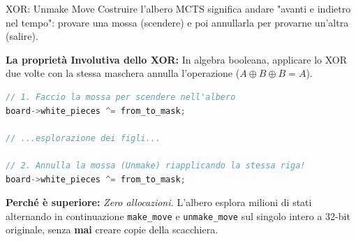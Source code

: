 \documentclass[10pt]{beamer}
\begin{document}
\begin{frame}[fragile]{XOR: Unmake Move}
    Costruire l'albero MCTS significa andare "avanti e indietro nel tempo": provare una mossa (scendere) e poi annullarla per provarne un'altra (salire).
    
    \vspace{0.1cm}
    
    \textbf{La proprietà Involutiva dello XOR:}
    In algebra booleana, applicare lo XOR due volte con la stessa maschera annulla l'operazione ($A \oplus B \oplus B = A$).
    
\begin{lstlisting}[language=C, basicstyle=\ttfamily\footnotesize, keywordstyle=\color{blue}]
// 1. Faccio la mossa per scendere nell'albero
board->white_pieces ^= from_to_mask; 

// ...esplorazione dei figli...

// 2. Annulla la mossa (Unmake) riapplicando la stessa riga!
board->white_pieces ^= from_to_mask; 
\end{lstlisting}
    
    \vspace{0.1cm}
    \textbf{Perché è superiore:} \textit{Zero allocazioni.} L'albero esplora milioni di stati alternando in continuazione \texttt{make\_move} e \texttt{unmake\_move} sul singolo intero a 32-bit originale, senza \textbf{mai} creare copie della scacchiera.
\end{frame}
\end{document}
